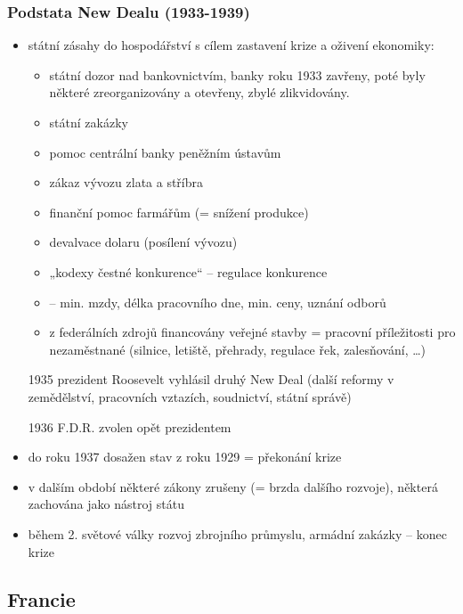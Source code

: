 \documentclass{article}
\begin{document}
\subsubsection*{Podstata New Dealu (1933-1939)}
\begin{itemize}
    \item státní zásahy do hospodářství s cílem zastavení krize a oživení ekonomiky:
    \begin{itemize}
        \item státní dozor nad bankovnictvím, banky roku 1933 zavřeny, poté byly některé zreorganizovány a otevřeny, zbylé zlikvidovány.
        \item státní zakázky
        \item pomoc centrální banky peněžním ústavům
        \item zákaz vývozu zlata a stříbra
        \item finanční pomoc farmářům (= snížení produkce)
        \item devalvace dolaru (posílení vývozu)
        \item „kodexy čestné konkurence“ – regulace konkurence
        \item {} -- min. mzdy, délka pracovního dne, min. ceny, uznání odborů
        \item z federálních zdrojů financovány veřejné stavby = pracovní příležitosti pro nezaměstnané (silnice, letiště, přehrady, regulace řek, zalesňování, …)
    \end{itemize}
    \item[1935] prezident Roosevelt vyhlásil druhý New Deal (další reformy v zemědělství, pracovních vztazích, soudnictví, státní správě)
    \item[1936] F.D.R. zvolen opět prezidentem
    \item do roku 1937 dosažen stav z roku 1929 = překonání krize
    \item v dalším období některé zákony zrušeny (= brzda dalšího rozvoje), některá zachována jako nástroj státu
    \item během 2. světové války rozvoj zbrojního průmyslu, armádní zakázky – konec krize
\end{itemize}

\subsection*{Francie}
\end{document}
